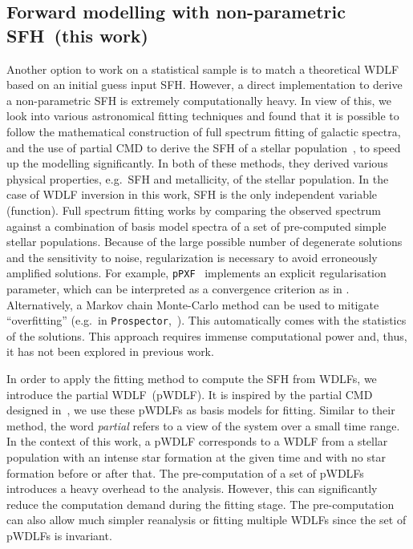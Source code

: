 \documentclass[fleqn,usenatbib]{mnras}
\begin{document}
\subsection{Forward modelling with non-parametric SFH~(this work)}
Another option to work on a statistical sample is to match a theoretical
WDLF based on an initial guess input SFH. However, a direct implementation to derive a
non-parametric SFH is extremely computationally heavy. In view of this, we look
into various astronomical fitting techniques and found that it is possible to
follow the mathematical construction of full spectrum fitting of galactic
spectra, and the use of partial CMD to derive the SFH of a stellar
population~\citep{2006A&A...459..783C}, to speed up the modelling significantly.
In both of these methods, they derived various physical properties, e.g.\ SFH
and metallicity, of the stellar population. In the case of WDLF inversion in
this work, SFH is the only independent variable (function). Full spectrum
fitting works by comparing the observed spectrum against a combination of basis
model spectra of a set of pre-computed simple stellar populations. Because of
the large possible number of degenerate solutions and the sensitivity to noise,
regularization is necessary to avoid erroneously amplified
solutions. For example, \texttt{pPXF}~\citep{2023MNRAS.526.3273C} implements an 
explicit regularisation parameter, which can be interpreted as a convergence 
criterion as in  \citet{2013MNRAS.434.1549R}. Alternatively, a Markov chain
Monte-Carlo method can be used to mitigate ``overfitting'' (e.g.\ in 
\texttt{Prospector},~\citealp{2021ApJS..254...22J}). This automatically comes
with the statistics of the solutions. This approach requires immense
computational power and, thus, it has not been explored in previous work.

In order to apply the fitting method to compute the SFH from WDLFs, we introduce
the partial WDLF~(pWDLF). It is inspired by the partial CMD designed
in~\citep{2006A&A...459..783C}, we use these pWDLFs as basis models for fitting.
Similar to their method, the word \textit{partial} refers to a view of the
system over a small time range. In the context of this work, a pWDLF corresponds
to a WDLF from a stellar population with an intense star formation at the given
time and with no star formation before or after that. The pre-computation of a
set of pWDLFs introduces a heavy overhead to the analysis. However, this can
significantly reduce the computation demand during the fitting stage. The
pre-computation can also allow much simpler reanalysis or fitting multiple
WDLFs since the set of pWDLFs is invariant.
\end{document}
